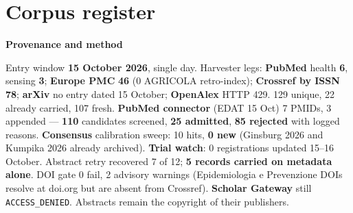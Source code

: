 \documentclass[10pt]{article}
\begin{document}
\clearpage
\section*{\sffamily\bfseries\color{Deep}Corpus register}
\vspace{-1.5mm}{\color{Amber}\rule{\linewidth}{1.1pt}}\vspace{2.5mm}



\vspace{2mm}

\begin{keybox}
{\sffamily\bfseries\footnotesize\color{Deep}Provenance and method}\\[1.2mm]
{\fontsize{7.2}{8.8}\selectfont
Entry window \textbf{15 October 2026}, single day. Harvester legs: \textbf{PubMed} health \textbf{6},
sensing \textbf{3}; \textbf{Europe PMC} \textbf{46} (0 AGRICOLA retro-index); \textbf{Crossref by ISSN}
\textbf{78}; \textbf{arXiv} no entry dated 15 October; \textbf{OpenAlex} HTTP 429. 129 unique, 22 already
carried, 107 fresh. \textbf{PubMed connector} (EDAT 15 Oct) 7 PMIDs, 3 appended --- \textbf{110} candidates
screened, \textbf{25 admitted}, \textbf{85 rejected} with logged reasons. \textbf{Consensus} calibration sweep:
10 hits, \textbf{0 new} (Ginsburg 2026 and Kumpika 2026 already archived). \textbf{Trial watch}: 0 registrations
updated 15--16 October. Abstract retry recovered 7 of 12; \textbf{5 records carried on metadata alone}.
DOI gate 0 fail, 2 advisory warnings (Epidemiologia e Prevenzione DOIs resolve at doi.org but are absent from
Crossref). \textbf{Scholar Gateway} still \texttt{ACCESS\_DENIED}. Abstracts remain the copyright of their
publishers.\par}
\end{keybox}
\end{document}
